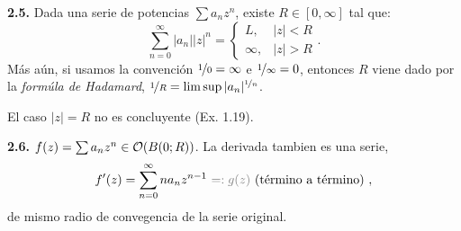 \begin{theorem}
    \textbf{2.5.} Dada una serie de potencias \(\sum a_n z^n\), existe \(R \in [0, \infty]\) tal que:  
    \[\sum_{n=0}^\infty |a_n||z|^n = \begin{cases}
        L, &|z| < R \\ 
        \infty,  &|z|>R 
    \end{cases}.\]
    Más aún, si usamos la convención \(\nicefrac{1}{0} = \infty\) e \(\nicefrac{1}{\infty} = 0\), entonces \(R\) viene dado por la \emph{formúla de Hadamard}, \(\nicefrac{1}{R} = \lim \sup |a_n|^{\nicefrac{1}{n}}\). 
\end{theorem}


\begin{note}
    El caso \(|z| = R\) no es concluyente (\textcolor{rojoscuro}{Ex. 1.19}).
\end{note}

\begin{theorem}
    \textbf{2.6.} \(f(z) = \sum a_n z^n \in \mathcal{O}(B(0;R))\). La derivada tambien es una serie, 
    \[f'(z) = \sum_{n=0}^\infty na_nz^{n-1} \ \textcolor{gray}{=:g(z)} \text{ (término a término)  },\] 
    de mismo radio de convegencia de la serie original. 
\end{theorem}

